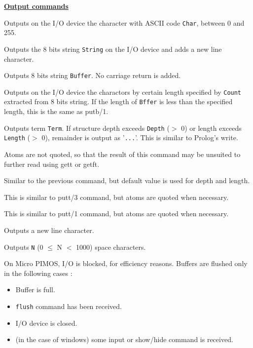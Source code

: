 \noindent\underline{\bf Output commands}\vspace{1ex}\par
{}
\begin{itemize}

Outputs on the I/O device the character with ASCII code \verb|Char|, between
0 and 255.

Outputs the 8 bits string \verb|String| on the I/O device and adds a new line
character.

Outputs 8 bits string \verb|Buffer|. No carriage return is added.

Outputs on the I/O device the charactors by certain length specified by
\verb|Count| extracted from 8 bits string. If the length of \verb|Bffer|
is less than the specified length, this is the same as putb/1.

Outputs term \verb|Term|. If structure depth exceeds \verb|Depth| ($>$ 0) or
length exceeds \verb|Length| ($>$ 0), remainder is output as '\verb|...|'.
This is similar to Prolog's write.

\Caution Atoms are not quoted, so that the result of this command may be
unsuited to further read using gett or getft.

Similar to the previous command, but default value is used for depth and
length.

This is similar to putt/3 command, but atoms are quoted when necessary.

This is similar to putt/1 command, but atoms are quoted when necessary.

Outputs a new line character.

Outputs \verb|N| (0 $\leq$ N $<$ 1000) space characters.

\end{itemize}
\Caution On Micro PIMOS, I/O is blocked, for efficiency reasons.
Buffers are flushed only in the following cases :
\begin{itemize}
\item Buffer is full.
\item \verb|flush| command has been received.
\item I/O device is closed.
\item (in the case of windows) some input or show/hide command is
received.
\end{itemize}
\vspace{1ex}

